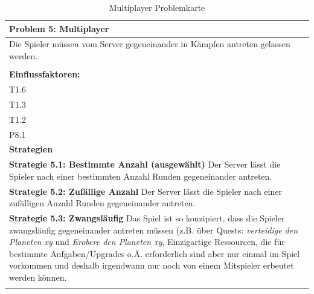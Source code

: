 \documentclass[fontsize=12pt,paper=a4,twoside]{scrartcl}
\begin{document}
\begin{table}[H]
    \centering
    \begin{tabular}{|p{15cm}|}
    \hline
          \textbf{Problem 5: Multiplayer}  \\ \hline
	Die Spieler müssen vom Server gegeneinander in Kämpfen antreten gelassen werden. \\
         \\ \hline
          \textbf{Einflussfaktoren: } \\
	T1.6 \\
	T1.3 \\
	T1.2 \\
	P8.1 \\
          \hline
          \textbf{Strategien} \\ \hline
            {}          
           \label{strategie:5.1}     
          \textbf{Strategie 5.1: Bestimmte Anzahl (ausgewählt)}  Der Server lässt die Spieler nach einer bestimmten Anzahl Runden gegeneinander antreten. \\        
  {}          
           \label{strategie:5.2}              
          \textbf{Strategie 5.2: Zufällige Anzahl} Der Server lässt die Spieler nach einer zufälligen Anzahl Runden gegeneinander antreten.   \\
	 {}          
           \label{strategie:5.3}     
          \textbf{Strategie 5.3: Zwangsläufig} Das Spiel ist so konzipiert, dass die Spieler zwangsläufig gegeneinander antreten müssen (z.B. über Quests: \textit{verteidige den Planeten xy} und \textit{Erobere den Planeten xy}, Einzigartige Ressourcen, die für bestimmte Aufgaben/Upgrades o.Ä. erforderlich sind aber nur einmal im Spiel vorkommen und deshalb irgendwann nur noch von einem Mitspieler erbeutet werden können.  \\ 
	 \\ \hline
    \end{tabular}

    \caption{Multiplayer Problemkarte}
    \label{tab:ProblemKarte5}
\end{table}
\end{document}

